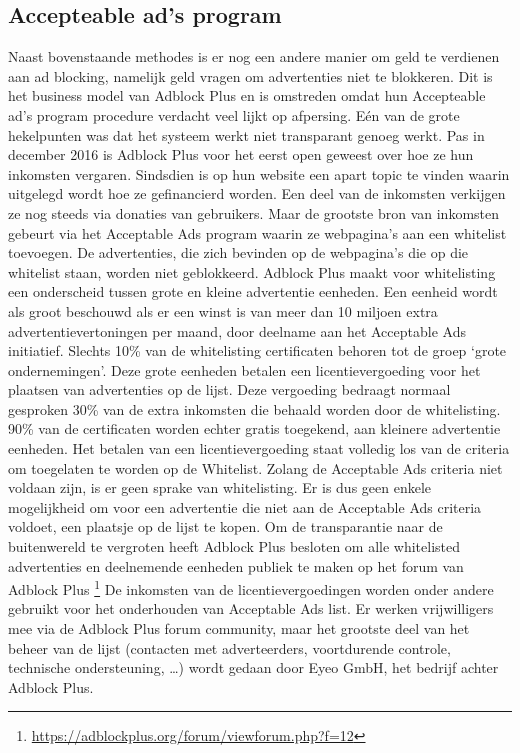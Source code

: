 \documentclass[pdftex,a4paper,12pt,twoside]{report}
\begin{document}
\subsection{ Accepteable ad's program}
\label{sec:Accepteable ad's program}
Naast bovenstaande methodes is er nog een andere manier om geld te verdienen aan ad blocking, namelijk geld vragen om advertenties niet te blokkeren. Dit is het business model van Adblock Plus en is omstreden omdat hun Accepteable ad's program procedure verdacht veel lijkt op afpersing. Eén van de grote hekelpunten was dat  het systeem werkt niet transparant genoeg werkt. Pas in december 2016 is Adblock Plus voor het eerst open geweest over hoe ze hun inkomsten vergaren. Sindsdien is op hun website een apart topic te vinden waarin uitgelegd wordt hoe ze gefinancierd worden. Een deel van de inkomsten verkijgen ze nog steeds via donaties van gebruikers.
Maar de grootste bron van inkomsten gebeurt via het Acceptable Ads program waarin ze webpagina's aan een whitelist toevoegen. De advertenties, die zich bevinden op de webpagina's die op die whitelist staan, worden niet geblokkeerd. 
Adblock Plus maakt voor whitelisting een onderscheid tussen grote en kleine advertentie eenheden. Een eenheid wordt als groot beschouwd als er een winst is van meer dan 10 miljoen extra advertentievertoningen per maand, door deelname aan het Acceptable Ads initiatief. Slechts 10\% van de whitelisting certificaten behoren tot de groep ‘grote ondernemingen’. Deze grote eenheden betalen een licentievergoeding voor het plaatsen van advertenties op de lijst. Deze vergoeding bedraagt normaal gesproken 30\% van de extra inkomsten die behaald worden door de whitelisting. 90\% van de certificaten worden echter gratis toegekend, aan kleinere advertentie eenheden. Het betalen van een licentievergoeding staat volledig los van de criteria om toegelaten te worden op de Whitelist. Zolang de Acceptable Ads criteria niet voldaan zijn, is er geen sprake van whitelisting. Er is dus geen enkele mogelijkheid om voor een advertentie die niet aan de Acceptable Ads criteria voldoet, een plaatsje op de lijst te kopen. Om de transparantie naar de buitenwereld te vergroten heeft Adblock Plus besloten om alle whitelisted advertenties en deelnemende eenheden publiek te maken op het forum van Adblock Plus \footnote{\url{https://adblockplus.org/forum/viewforum.php?f=12}}
De inkomsten van de licentievergoedingen worden onder andere gebruikt voor het onderhouden van Acceptable Ads list. Er werken vrijwilligers mee via de Adblock Plus forum community, maar het grootste deel van het beheer van de lijst (contacten met adverteerders, voortdurende controle, technische ondersteuning, …) wordt gedaan  door Eyeo GmbH, het bedrijf achter Adblock Plus.
\end{document}
